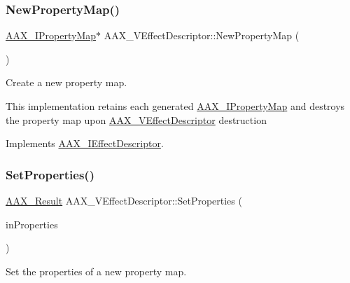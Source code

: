 \mbox{\label{a01913_a3e7b723b8e60fbc6271c6f5bcc7ad7dd}} 
\subsubsection{\texorpdfstring{NewPropertyMap()}{NewPropertyMap()}}
{\footnotesize\ttfamily \mbox{\hyperlink{a01869}{A\+A\+X\+\_\+\+I\+Property\+Map}}$\ast$ A\+A\+X\+\_\+\+V\+Effect\+Descriptor\+::\+New\+Property\+Map (\begin{DoxyParamCaption}{ }\end{DoxyParamCaption})\hspace{0.3cm}{\ttfamily [virtual]}}



Create a new property map. 

This implementation retains each generated \mbox{\hyperlink{a01869}{A\+A\+X\+\_\+\+I\+Property\+Map}} and destroys the property map upon \mbox{\hyperlink{a01913}{A\+A\+X\+\_\+\+V\+Effect\+Descriptor}} destruction 

Implements \mbox{\hyperlink{a01813_ac90c1b595d65259f798429474bbe926f}{A\+A\+X\+\_\+\+I\+Effect\+Descriptor}}.

\mbox{\label{a01913_a80928483b2aaa3f7e2a607499ee5180c}} 
\subsubsection{\texorpdfstring{SetProperties()}{SetProperties()}}
{\footnotesize\ttfamily \mbox{\hyperlink{a00392_a4d8f69a697df7f70c3a8e9b8ee130d2f}{A\+A\+X\+\_\+\+Result}} A\+A\+X\+\_\+\+V\+Effect\+Descriptor\+::\+Set\+Properties (\begin{DoxyParamCaption}\item[{\mbox{\hyperlink{a01869}{A\+A\+X\+\_\+\+I\+Property\+Map}} $\ast$}]{in\+Properties }\end{DoxyParamCaption})\hspace{0.3cm}{\ttfamily [virtual]}}



Set the properties of a new property map. 


